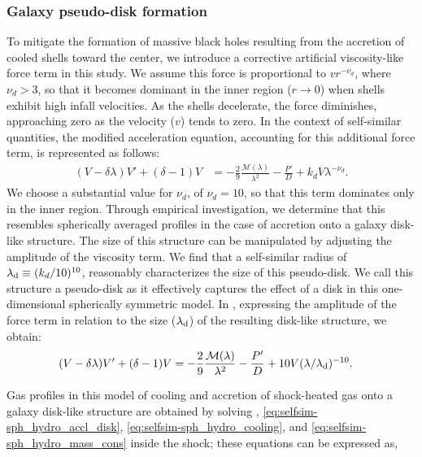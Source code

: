 \subsubsection{Galaxy pseudo-disk formation}%
To mitigate the formation of massive black holes resulting from the accretion of cooled shells toward the center, we introduce a corrective artificial viscosity-like force term in this study. We assume this force is proportional to $vr^{-\nu_d}$, where $\nu_d>3$, so that it becomes dominant in the inner region ($r \rightarrow 0$) when shells exhibit high infall velocities. As the shells decelerate, the force diminishes, approaching zero as the velocity ($v$) tends to zero. In the context of self-similar quantities, the modified acceleration equation, accounting for this additional force term, is represented as follows:
\begin{align}
\label{eq:selfsim-sph_hydro_accl_disk_gen}
(V-\delta \lambda) V' + (\delta -1 ) V &= - \frac{2}{9} \frac{\mathcal{M}(\lambda)}{\lambda^2 } - \frac{P'}{D} + k_d V \lambda^{-\nu_d}.
\end{align}
We choose a substantial value for $\nu_d$, of $\nu_d=10$, so that this term dominates only in the inner region. Through empirical investigation, we determine that this resembles spherically averaged profiles in the case of
accretion onto a galaxy disk-like structure. The size of this structure can be manipulated by adjusting the amplitude of the viscosity term. We find that a self-similar radius of $\lambda_{\rm d} \equiv (k_d/10)^{10}$, reasonably characterizes the size of this pseudo-disk. We call this structure a pseudo-disk as it effectively captures the effect of a disk in this one-dimensional spherically symmetric model.  In , expressing the amplitude of the force term in relation to the size ($\lambda_{\rm d}$) of the resulting disk-like structure, we obtain:
\begin{align}
\label{eq:selfsim-sph_hydro_accl_disk}
(V-\delta \lambda) V' + (\delta -1 ) V &= - \frac{2}{9} \frac{\mathcal{M}(\lambda)}{\lambda^2 } - \frac{P'}{D} + 10V(\lambda/\lambda_{\rm d})^{-10}.
\end{align}

\noindent
Gas profiles in this model of cooling and accretion of shock-heated gas onto a galaxy disk-like structure are obtained by solving , \eqref{eq:selfsim-sph_hydro_accl_disk}, \eqref{eq:selfsim-sph_hydro_cooling}, and \eqref{eq:selfsim-sph_hydro_mass_cons} inside the shock; these equations can be expressed as,

